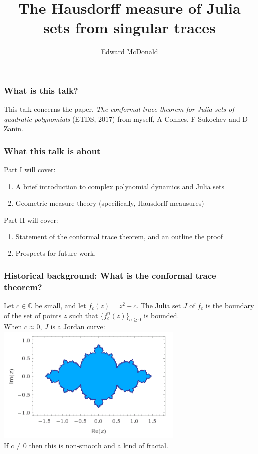 \documentclass{beamer} %
\title{The Hausdorff measure of Julia sets from singular traces}
\author{Edward McDonald}
\institute{UNSW}
\theoremstyle{definition} %
\newcommand{\Cplx}{\mathbb{C}}
\begin{document}
\begin{frame} 
\titlepage
\end{frame}

\begin{frame}\frametitle{What is this talk?}
    This talk concerns the paper, 
    \emph{ The conformal trace theorem for Julia sets of quadratic polynomials}
    (ETDS, 2017) from myself, A Connes, F Sukochev and D Zanin.
\end{frame}

\begin{frame}\frametitle{What this talk is about}
    Part I will cover:
    \begin{enumerate}
        \item{} A brief introduction to complex polynomial dynamics and Julia sets
        \item{} Geometric measure theory (specifically, Hausdorff meausures)
    \end{enumerate}
    
    Part II will cover:
    \begin{enumerate}
        \item{} Statement of the conformal trace theorem, and an outline the proof
        \item{} Prospects for future work.
    \end{enumerate}
\end{frame}

\begin{frame}\frametitle{Historical background: What is the conformal trace theorem?}
    Let $c \in \Cplx$ be small, and let $f_c(z) = z^2+c$. The Julia set $J$ of $f_c$ is the boundary of the set of points $z$ such that $\{f_c^n(z)\}_{n\geq 0}$ is bounded.\\
    When $c \approx 0$, $J$ is a Jordan curve:\\
    \includegraphics[width=90mm]{img/julia-07001-filled.png}\\
    If $c \neq 0$ then this is non-smooth and a kind of fractal.
\end{frame}
\end{document}
